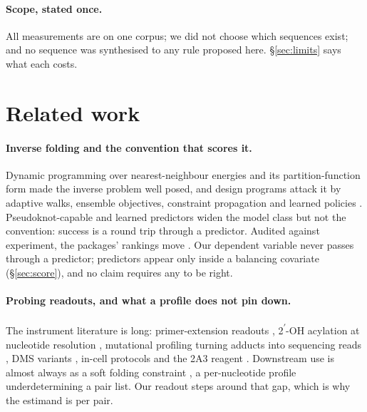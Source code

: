 \documentclass[11pt]{article}
\begin{document}
\paragraph{Scope, stated once.} All measurements are on one corpus; we did not choose which
sequences exist; and no sequence was synthesised to any rule proposed here. \S\ref{sec:limits}
says what each costs.

\section{Related work}
\label{sec:related}

\paragraph{Inverse folding and the convention that scores it.} Dynamic programming over
nearest-neighbour energies \citep{zuker1981optimal,hofacker1994fast} and its partition-function
form \citep{mccaskill1990equilibrium,lorenz2011vienna} made the inverse problem well posed, and
design programs attack it by adaptive walks, ensemble objectives, constraint propagation and
learned policies \citep{andronescu2004new,busch2006info,zadeh2011nupack,kleinkauf2015antarna,
runge2019learna}. Pseudoknot-capable \citep{rivas1999dynamic,reeder2004design,janssen2015pkiss,
bellaousov2010probknot,hajdin2013accurate} and learned predictors \citep{singh2019spotrna,
sato2021rna,fu2022ufold} widen the model class but not the convention: success is a round trip
through a predictor. Audited against experiment, the packages' rankings move
\citep{waymentsteele2022rna}. Our dependent variable never passes through a predictor; predictors
appear only inside a balancing covariate (\S\ref{sec:score}), and no claim requires any to be
right.

\paragraph{Probing readouts, and what a profile does not pin down.} The instrument literature is long: primer-extension readouts \citep{ehresmann1987probing},
2\textsuperscript{$\prime$}-OH acylation at nucleotide resolution
\citep{merino2005rna,wilkinson2006selective,weeks2010advances}, mutational profiling turning adducts
into sequencing reads \citep{siegfried2014rna,smola2015selective}, DMS variants
\citep{cordero2012quantitative,zubradt2017dms}, in-cell protocols
\citep{rouskin2014genome,spitale2015structural} and the 2A3 reagent \citep{marinus2021novel}.
Downstream use is almost always as a soft folding constraint
\citep{mathews2004incorporating,deigan2009accurate,hajdin2013accurate}, a per-nucleotide profile
underdetermining a pair list. Our readout steps around that gap, which is why the estimand
is per pair.
\end{document}
